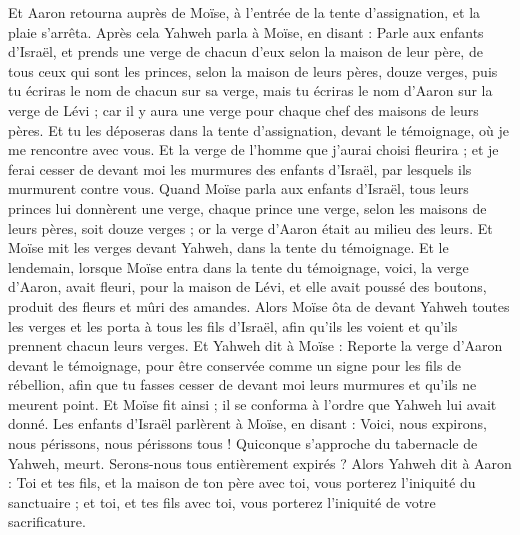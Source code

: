 \begin{multicols}{2}
Et Aaron retourna auprès de Moïse, à l'entrée de la tente d'assignation, et la plaie s'arrêta.
\VerseOne{}Après cela Yahweh parla à Moïse, en disant :
Parle aux enfants d'Israël, et prends une verge de chacun d'eux selon la maison de leur père, de tous ceux qui sont les princes, selon la maison de leurs pères, douze verges, puis tu écriras le nom de chacun sur sa verge,
mais tu écriras le nom d'Aaron sur la verge de Lévi ; car il y aura une verge pour chaque chef des maisons de leurs pères.
Et tu les déposeras dans la tente d'assignation, devant le témoignage, où je me rencontre avec vous.
Et la verge de l'homme que j'aurai choisi fleurira ; et je ferai cesser de devant moi les murmures des enfants d'Israël, par lesquels ils murmurent contre vous.
Quand Moïse parla aux enfants d'Israël, tous leurs princes lui donnèrent une verge, chaque prince une verge, selon les maisons de leurs pères, soit douze verges ; or la verge d'Aaron était au milieu des leurs.
Et Moïse mit les verges devant Yahweh, dans la tente du témoignage.
Et le lendemain, lorsque Moïse entra dans la tente du témoignage, voici, la verge d'Aaron, avait fleuri, pour la maison de Lévi, et elle avait poussé des boutons, produit des fleurs et mûri des amandes.
Alors Moïse ôta de devant Yahweh toutes les verges et les porta à tous les fils d'Israël, afin qu'ils les voient et qu'ils prennent chacun leurs verges.
Et Yahweh dit à Moïse : Reporte la verge d'Aaron devant le témoignage, pour être conservée comme un signe pour les fils de rébellion, afin que tu fasses cesser de devant moi leurs murmures et qu'ils ne meurent point.
Et Moïse fit ainsi ; il se conforma à l'ordre que Yahweh lui avait donné.
Les enfants d'Israël parlèrent à Moïse, en disant : Voici, nous expirons, nous périssons, nous périssons tous !
Quiconque s'approche du tabernacle de Yahweh, meurt. Serons-nous tous entièrement expirés ?
\VerseOne{}Alors Yahweh dit à Aaron : Toi et tes fils, et la maison de ton père avec toi, vous porterez l'iniquité du sanctuaire ; et toi, et tes fils avec toi, vous porterez l'iniquité de votre sacrificature.

\end{multicols}
